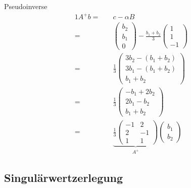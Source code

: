 \begin{example}{Pseudoinverse}
    \begin{alignat*}{1}
        A^+ b = \quad & c - \alpha B \\
        = \quad       &
        \begin{pmatrix}
            b_2 \\
            b_1 \\
            0
        \end{pmatrix}
        -
        \frac{b_1 + b_2}{3}
        \begin{pmatrix}
            1 \\ 1 \\ -1
        \end{pmatrix}   \\
        = \quad       & \frac{1}{3}
        \begin{pmatrix}
            3b_2 - (b_1 + b_2) \\
            3b_1 - (b_1 + b_2) \\
            b_1 + b_2
        \end{pmatrix}   \\
        = \quad       & \frac{1}{3}
        \begin{pmatrix}
            -b_1 + 2b_2 \\
            2b_1 - b_2  \\
            b_1 + b_2
        \end{pmatrix}   \\
        = \quad       &
        \underbrace{
            \frac{1}{3}
            \begin{pmatrix}
                -1 & 2  \\
                2  & -1 \\
                1  & 1
            \end{pmatrix}
        }_{A^+}
        \begin{pmatrix}
            b_1 \\ b_2
        \end{pmatrix}
    \end{alignat*}
\end{example}

\subsection{Singulärwertzerlegung}


